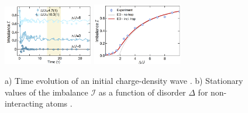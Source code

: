 

\begin{figure}[h]
    \centering
    \includegraphics[align=c, width=0.35\textwidth]{imgs/MBL_exp_1.png}
    \hspace{10 mm} 
    \includegraphics[align=c, width=0.35\textwidth]{imgs/MBL_exp_2.png}
    \caption{
    a) Time evolution of an initial charge-density wave
    \cite{schreiber_observation_2015} 
    . 
    b) Stationary values of the imbalance $\mathcal{I}$ as a function of disorder $\Delta$ for non-interacting atoms 
    \cite{schreiber_observation_2015} 
    .
    }
    \label{fig:loc1D1}
\end{figure}

